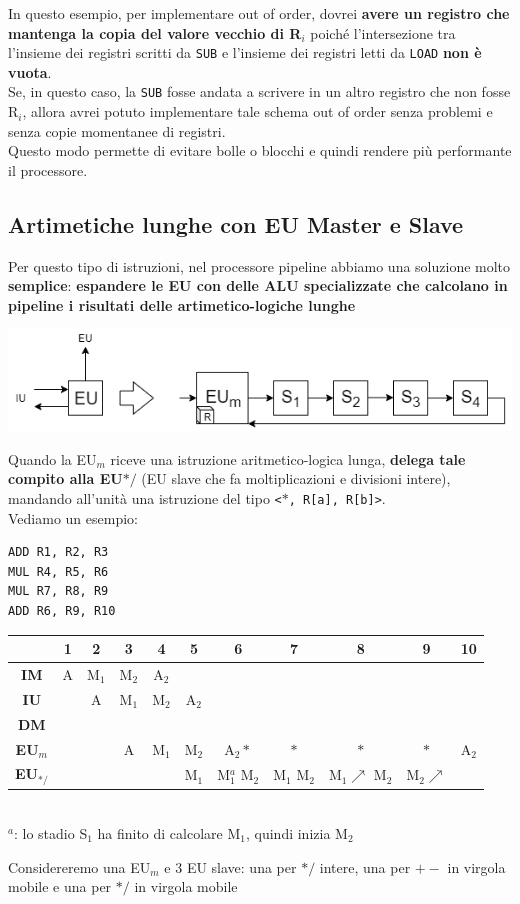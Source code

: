 \documentclass[10pt]{report}
\begin{document}
In questo esempio, per implementare out of order, dovrei \textbf{avere un registro che mantenga la copia del valore vecchio di R$_i$} poiché l'intersezione tra l'insieme dei registri scritti da \texttt{SUB} e l'insieme dei registri letti da \texttt{LOAD} \textbf{non è vuota}.\\
Se, in questo caso, la \texttt{SUB} fosse andata a scrivere in un altro registro che non fosse R$_i$, allora avrei potuto implementare tale schema out of order senza problemi e senza copie momentanee di registri.\\
Questo modo permette di evitare bolle o blocchi e quindi rendere più performante il processore.
\subsection{Artimetiche lunghe con EU Master e Slave}
Per questo tipo di istruzioni, nel processore pipeline abbiamo una soluzione molto \textbf{semplice}: \textbf{espandere le EU con delle ALU specializzate che calcolano in pipeline i risultati delle artimetico-logiche lunghe}
\begin{center}
	\includegraphics[scale=0.88]{eumasterslave.png}
\end{center}
Quando la EU$_m$ riceve una istruzione aritmetico-logica lunga, \textbf{delega tale compito alla EU$*/$} (EU slave che fa moltiplicazioni e divisioni intere), mandando all'unità una istruzione del tipo \texttt{<$*$, R[a], R[b]>}.\\
Vediamo un esempio:
\begin{lstlisting}
ADD	R1, R2, R3
MUL	R4, R5, R6
MUL	R7, R8, R9
ADD	R6, R9, R10
\end{lstlisting}
\begin{center}
\begin{tabular}{c|c|c|c|c|c|c|c|c|c|c|}
	 & 1 & 2 & 3 & 4 & 5 & 6 & 7 & 8 & 9 & 10 \\
	\hline
	\textbf{IM} & A & M$_1$ & M$_2$ & A$_2$ & & & & & & \\
	\hline
	\textbf{IU} & & A & M$_1$ & M$_2$ & A$_2$ & & & & & \\
	\hline
	\textbf{DM} & & & & & & & & & & \\
	\hline
	\textbf{EU$_m$} & & & A & M$_1$ & M$_2$ & A$_2*$ & $*$ & $*$ & $*$ & A$_2$ \\
	\hline
	\textbf{EU$_{*/}$} & & & & & M$_1$ & \makecell{M$_1^a$ \\ M$_2$} & \makecell{M$_1$ \\ M$_2$}& \makecell{M$_1\nearrow$ \\ M$_2$} & M$_2\nearrow$ & \\
	\hline
\end{tabular}\\
$^a$: lo stadio S$_1$ ha finito di calcolare M$_1$, quindi inizia M$_2$
\end{center}
Considereremo una EU$_m$ e 3 EU slave: una per $*/$ intere, una per $+-$ in virgola mobile e una per $*/$ in virgola mobile
\end{document}
